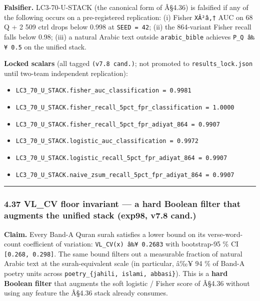 \documentclass[
]{article}
\providecommand{\tightlist}{%
  \setlength{\itemsep}{0pt}\setlength{\parskip}{0pt}}
\begin{document}
\textbf{Falsifier.} LC3-70-U-STACK (the canonical form of Â§4.36) is
falsified if any of the following occurs on a pre-registered
replication: (i) Fisher \texttt{XÂ²â‚†} AUC on 68 Q + 2 509 ctrl drops
below 0.998 at \texttt{SEED\ =\ 42}; (ii) the 864-variant Fisher recall
falls below 0.98; (iii) a natural Arabic text outside
\texttt{arabic\_bible} achieves \texttt{P\_Q\ â‰¥\ 0.5} on the unified
stack.

\textbf{Locked scalars} (all tagged \texttt{(v7.8\ cand.)}; not promoted
to \texttt{results\_lock.json} until two-team independent replication):

\begin{itemize}
\tightlist
\item
  \texttt{LC3\_70\_U\_STACK.fisher\_auc\_classification\ =\ 0.9981}
\item
  \texttt{LC3\_70\_U\_STACK.fisher\_recall\_5pct\_fpr\_classification\ =\ 1.0000}
\item
  \texttt{LC3\_70\_U\_STACK.fisher\_recall\_5pct\_fpr\_adiyat\_864\ =\ 0.9907}
\item
  \texttt{LC3\_70\_U\_STACK.logistic\_auc\_classification\ =\ 0.9972}
\item
  \texttt{LC3\_70\_U\_STACK.logistic\_recall\_5pct\_fpr\_adiyat\_864\ =\ 0.9907}
\item
  \texttt{LC3\_70\_U\_STACK.naive\_zsum\_recall\_5pct\_fpr\_adiyat\_864\ =\ 0.9907}
\end{itemize}

\begin{center}\rule{0.5\linewidth}{0.5pt}\end{center}

\subsubsection{4.37 VL\_CV floor invariant --- a hard Boolean filter
that augments the unified stack (exp98, v7.8
cand.)}\label{vl_cv-floor-invariant-a-hard-boolean-filter-that-augments-the-unified-stack-exp98-v7.8-cand.}

\textbf{Claim.} Every Band-A Quran surah satisfies a lower bound on its
verse-word-count coefficient of variation:
\texttt{VL\_CV(x)\ â‰¥\ 0.2683} with bootstrap-95 \% CI
\texttt{{[}0.268,\ 0.298{]}}. The same bound filters out a measurable
fraction of natural Arabic text at the surah-equivalent scale (in
particular, â‰¥ 94 \% of Band-A poetry units across
\texttt{poetry\_\{jahili,\ islami,\ abbasi\}}). This is a \textbf{hard
Boolean filter} that augments the soft logistic / Fisher score of Â§4.36
without using any feature the Â§4.36 stack already consumes.
\end{document}
